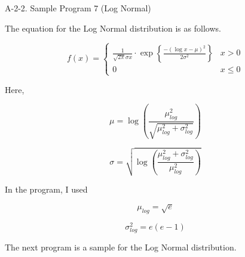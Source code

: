 \vspace*{20mm}

\noindent
{\Large A-2-2. Sample Program 7 (Log Normal)}

\vspace*{7mm}

\noindent
The equation for the Log Normal distribution is as follows.

\begin{equation}
f(x) = \left\{
\begin{array}{ll}
\frac{1}{\sqrt{2\pi} \sigma x} \cdot \exp \left\{ \frac{-(\log x - \mu )^2}{2 \sigma^2} \right\} & x>0 \\
0 & x \le 0
\end{array}
\right.
\end{equation}

\noindent
Here,

\begin{equation}
\mu = \log \left( \frac{\mu_{log}^2}{\sqrt{\mu_{log}^2 +
\sigma_{log}^2}} \right)
\end{equation}

\begin{equation}
\sigma = \sqrt{\log \left( \frac{\mu_{log}^2+\sigma_{log}^2}{\mu_{log}^2} \right)}
\end{equation}

\noindent
In the program, I used 

\begin{equation}
\mu_{log} = \sqrt{e}
\end{equation}

\clearpage

\begin{equation}
\sigma_{log}^2 = e (e-1)
\end{equation}

\vspace*{5mm}

\noindent
The next program is a sample for the Log Normal distribution.

\vspace*{10mm}

